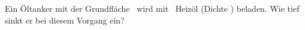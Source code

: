 Ein Öltanker mit der Grundfläche \AtkO\ wird mit \mOelO\ Heizöl (Dichte \rhoOeO) beladen. Wie tief sinkt er bei diesem Vorgang ein?
